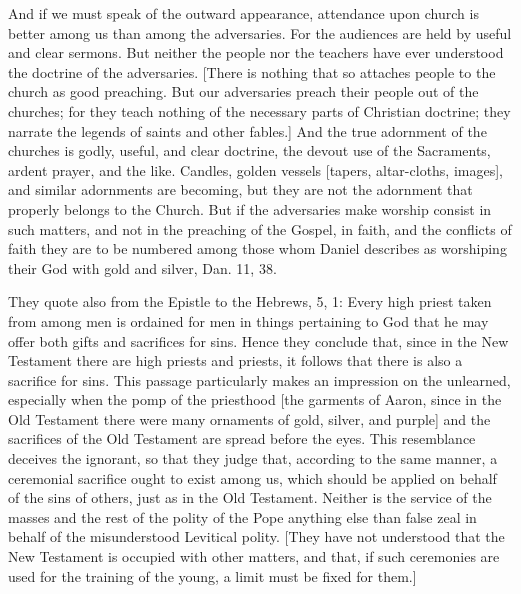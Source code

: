 And if we must speak of the outward appearance, attendance upon
church is better among us than among the adversaries.  For the
audiences are held by useful and clear sermons.  But neither the
people nor the teachers have ever understood the doctrine of the
adversaries.  [There is nothing that so attaches people to the church
as good preaching.  But our adversaries preach their people out of
the churches; for they teach nothing of the necessary parts of
Christian doctrine; they narrate the legends of saints and other
fables.] And the true adornment of the churches is godly, useful, and
clear doctrine, the devout use of the Sacraments, ardent prayer, and
the like.  Candles, golden vessels [tapers, altar-cloths, images],
and similar adornments are becoming, but they are not the adornment
that properly belongs to the Church.  But if the adversaries make
worship consist in such matters, and not in the preaching of the
Gospel, in faith, and the conflicts of faith they are to be numbered
among those whom Daniel describes as worshiping their God with gold
and silver, Dan. 11, 38.

They quote also from the Epistle to the Hebrews, 5, 1: Every high
priest taken from among men is ordained for men in things pertaining
to God that he may offer both gifts and sacrifices for sins.  Hence
they conclude that, since in the New Testament there are high priests
and priests, it follows that there is also a sacrifice for sins.
This passage particularly makes an impression on the unlearned,
especially when the pomp of the priesthood [the garments of Aaron,
since in the Old Testament there were many ornaments of gold, silver,
and purple] and the sacrifices of the Old Testament are spread before
the eyes.  This resemblance deceives the ignorant, so that they judge
that, according to the same manner, a ceremonial sacrifice ought to
exist among us, which should be applied on behalf of the sins of
others, just as in the Old Testament.  Neither is the service of the
masses and the rest of the polity of the Pope anything else than
false zeal in behalf of the misunderstood Levitical polity.  [They
have not understood that the New Testament is occupied with other
matters, and that, if such ceremonies are used for the training of
the young, a limit must be fixed for them.]

